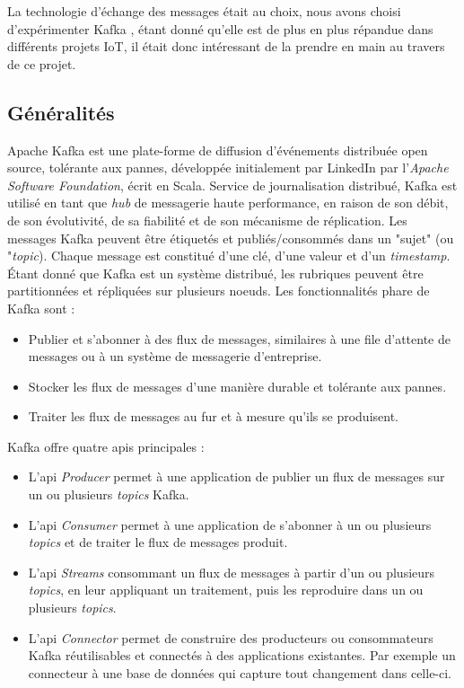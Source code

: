 La technologie d'échange des messages était au choix, nous avons choisi d'expérimenter Kafka \cite{kafka}, étant donné qu'elle est de plus en plus répandue dans différents projets IoT, il était donc intéressant de la prendre en main au travers de ce projet.

\subsection{Généralités}
Apache Kafka est une plate-forme de diffusion d'événements distribuée open source, tolérante aux pannes, développée initialement par LinkedIn par l'\textit{Apache Software Foundation}, écrit en Scala. Service de journalisation distribué, Kafka est utilisé en tant que \textit{hub} de messagerie haute performance, en raison de son débit, de son évolutivité, de sa fiabilité et de son mécanisme de réplication. Les messages Kafka peuvent être étiquetés et publiés/consommés dans un "sujet" (ou "\textit{topic}). Chaque message est constitué d'une clé, d'une valeur et d'un \textit{timestamp}. Étant donné que Kafka est un système distribué, les rubriques peuvent être partitionnées et répliquées sur plusieurs noeuds. Les fonctionnalités phare de Kafka sont :
\begin{itemize}
    \item Publier et s'abonner à des flux de messages, similaires à une file d'attente de messages ou à un système de messagerie d'entreprise.
    \item Stocker les flux de messages d'une manière durable et tolérante aux pannes.
    \item Traiter les flux de messages au fur et à mesure qu'ils se produisent.
\end{itemize}

Kafka offre quatre \acrshort{api}s principales :
\begin{itemize}
    \item L'\acrshort{api} \textit{Producer} permet à une application de publier un flux de messages sur un ou plusieurs \textit{topics} Kafka.
    \item L'\acrshort{api} \textit{Consumer} permet à une application de s'abonner à un ou plusieurs \textit{topics} et de traiter le flux de messages produit.
    \item L'\acrshort{api} \textit{Streams} consommant un flux de messages à partir d'un ou plusieurs \textit{topics}, en leur appliquant un traitement, puis les reproduire dans un ou plusieurs \textit{topics}.
    \item L'\acrshort{api} \textit{Connector} permet de construire des producteurs ou consommateurs Kafka réutilisables et connectés à des applications existantes. Par exemple un connecteur à une base de données qui capture tout changement dans celle-ci.
\end{itemize}

